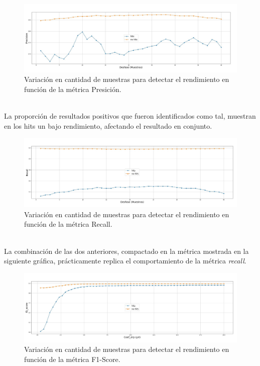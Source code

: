 \documentclass[../00_Main.tex]{subfiles}
\begin{document}
\begin{figure}[H]
    \raggedright
    \includegraphics[scale=0.26]{02_Images/resultados_caso2_a_precision}
    \caption{Variación en cantidad de muestras para detectar el rendimiento en función de la métrica Presición.}
    \label{fig:resultados_caso2_a_precision}
\end{figure} \\

La proporción de resultados positivos que fueron identificados como tal, muestran en los hits un bajo rendimiento, afectando el resultado en conjunto.

\begin{figure}[H]
   \raggedright
    \includegraphics[scale=0.26]{02_Images/resultados_caso2_b_recall}
     \caption{Variación en cantidad de muestras para detectar el rendimiento en función de la métrica Recall.}
    \label{fig:resultados_caso2_b_recall}
\end{figure} \\

La combinación de las dos anteriores, compactado en la métrica mostrada en la siguiente gráfica, prácticamente replica el comportamiento de la métrica  \textit{recall}.

\begin{figure}[H]
    \raggedright
    \includegraphics[scale=0.26]{02_Images/resultados_caso1_c_f1_score}
     \caption{Variación en cantidad de muestras para detectar el rendimiento en función de la métrica F1-Score.}
    \label{fig:resultados_caso1_c_f1_score}
\end{figure}
\end{document}
